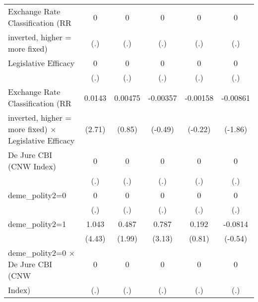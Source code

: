 {\begin{tabular}{l*{5}{c}}
\addlinespace
Exchange Rate Classification (RR        &        0         &        0         &        0         &        0         &        0         \\
inverted, higher = more fixed)          &      (.)         &      (.)         &      (.)         &      (.)         &      (.)         \\
\addlinespace
Legislative Efficacy                    &        0         &        0         &        0         &        0         &        0         \\
                                        &      (.)         &      (.)         &      (.)         &      (.)         &      (.)         \\
\addlinespace
Exchange Rate Classification (RR        &   0.0143\sym{**} &  0.00475         & -0.00357         & -0.00158         & -0.00861         \\
inverted, higher = more fixed) $\times$ Legislative Efficacy&   (2.71)         &   (0.85)         &  (-0.49)         &  (-0.22)         &  (-1.86)         \\
\addlinespace
De Jure CBI (CNW Index)                 &        0         &        0         &        0         &        0         &        0         \\
                                        &      (.)         &      (.)         &      (.)         &      (.)         &      (.)         \\
\addlinespace
deme\_polity2=0                          &        0         &        0         &        0         &        0         &        0         \\
                                        &      (.)         &      (.)         &      (.)         &      (.)         &      (.)         \\
\addlinespace
deme\_polity2=1                          &    1.043\sym{***}&    0.487\sym{*}  &    0.787\sym{**} &    0.192         &  -0.0814         \\
                                        &   (4.43)         &   (1.99)         &   (3.13)         &   (0.81)         &  (-0.54)         \\
\addlinespace
deme\_polity2=0 $\times$ De Jure CBI (CNW&        0         &        0         &        0         &        0         &        0         \\
Index)                                  &      (.)         &      (.)         &      (.)         &      (.)         &      (.)         \\

\end{tabular}}
